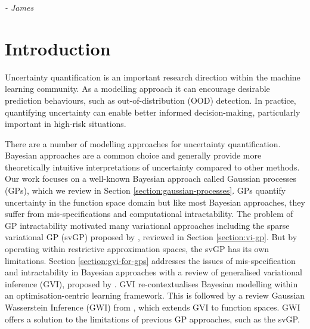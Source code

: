 \documentclass{article}
\numberwithin{equation}{section}
\begin{document}
\hspace*{\fill} \textit{- James}

\newpage
\tableofcontents
\newpage
{}
\setcounter{page}{1}

\newpage
\section{Introduction}
Uncertainty quantification is an important research direction within the machine learning community.
As a modelling approach it can encourage desirable prediction behaviours, such as out-of-distribution (OOD) detection. 
In practice, quantifying uncertainty can enable better informed decision-making, particularly important in high-risk situations.


There are a number of modelling approaches for uncertainty quantification. 
Bayesian approaches are a common choice and generally provide more theoretically intuitive interpretations of uncertainty compared to other methods. 
Our work focuses on a well-known Bayesian approach called Gaussian processes (GPs), which we review in Section \ref{section:gaussian-processes}.
GPs quantify uncertainty in the function space domain but like most Bayesian approaches, they suffer from mis-specifications and computational intractability. 
The problem of GP intractability motivated many variational approaches including the sparse variational GP (svGP) proposed by \cite{titsias2009variational}, reviewed in Section \ref{section:vi-gp}.
But by operating within restrictive approximation spaces, the svGP has its own limitations. 
Section \ref{section:gvi-for-gps} addresses the issues of mis-specification and intractability in Bayesian approaches with a review of generalised variational inference (GVI), proposed by \cite{knoblauch2022optimization}. 
GVI re-contextualises Bayesian modelling within an optimisation-centric learning framework.
This is followed by a review Gaussian Wasserstein Inference (GWI) from \cite{wild2022generalized}, which extends GVI to function spaces.
GWI offers a solution to the limitations of previous GP approaches, such as the svGP.
\end{document}
